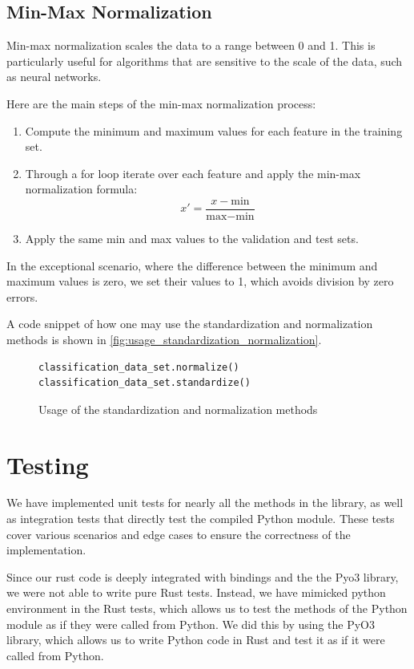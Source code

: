 \documentclass[review]{AIM_report}
\begin{document}
\subsection{Min-Max Normalization}
Min-max normalization scales the data to a range between 0 and 1. This is particularly useful for algorithms that are sensitive to the scale of the data, such as neural networks.

Here are the main steps of the min-max normalization process:
\begin{enumerate}
    \item Compute the minimum and maximum values for each feature in the training set.
    \item Through a for loop iterate over each feature and apply the min-max normalization formula:
          \begin{equation}
              x' = \frac{x - \text{min}}{\text{max} - \text{min}}
          \end{equation}
    \item Apply the same min and max values to the validation and test sets.
\end{enumerate}

In the exceptional scenario, where the difference between the minimum and maximum values is zero, we set their values to 1, which avoids division by zero errors.

A code snippet of how one may use the standardization and normalization methods is shown in \autoref{fig:usage_standardization_normalization}.
\begin{figure}[H]
    \begin{lstlisting}[style=python]
classification_data_set.normalize()
classification_data_set.standardize()
    \end{lstlisting}
    \caption{Usage of the standardization and normalization methods}
    \label{fig:usage_standardization_normalization}
\end{figure}

\newpage
\section{Testing}
\label{sec:testing}
We have implemented unit tests for nearly all the methods in the library, as well as integration tests that directly test the compiled Python module. These tests cover various scenarios and edge cases to ensure the correctness of the implementation.

Since our rust code is deeply integrated with bindings and the the Pyo3 library, we were not able to write pure Rust tests. Instead, we have mimicked python environment in the Rust tests, which allows us to test the methods of the Python module as if they were called from Python.
We did this by using the PyO3 library, which allows us to write Python code in Rust and test it as if it were called from Python.
\end{document}
